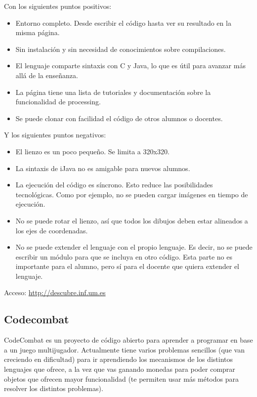 \documentclass{report}
\begin{document}
	Con los siguientes puntos positivos:
	
	\begin{itemize}
		\item Entorno completo. Desde escribir el código hasta ver su resultado en la misma página.
		\item Sin instalación y sin necesidad de conocimientos sobre compilaciones.
		\item El lenguaje comparte sintaxis con C y Java, lo que es útil para avanzar más allá de la enseñanza. 
		\item La página tiene una lista de tutoriales y documentación sobre la funcionalidad de processing.
		\item Se puede clonar con facilidad el código de otros alumnos o docentes.
	\end{itemize}
	
	Y los siguientes puntos negativos:
	
	\begin{itemize}
		\item El lienzo es un poco pequeño. Se limita a 320x320.
		\item La sintaxis de iJava no es amigable para nuevos alumnos.
		\item La ejecución del código es síncrono. Esto reduce las posibilidades tecnológicas. Como por ejemplo, no se pueden cargar imágenes en tiempo de ejecución.
		\item No se puede rotar el lienzo, así que todos los dibujos deben estar alineados a los ejes de coordenadas.
		\item No se puede extender el lenguaje con el propio lenguaje. Es decir, no se puede escribir un módulo para que se incluya en otro código. Esta parte no es importante para el alumno, pero sí para el docente que quiera extender el lenguaje.
	\end{itemize}
	
	\hfill
	
	Acceso: \url{http://descubre.inf.um.es}
	
	\subsection{Codecombat}
	
	CodeCombat es un proyecto de código abierto para aprender a programar en base a un juego multijugador. Actualmente tiene varios problemas sencillos (que van creciendo en dificultad) para ir aprendiendo los mecanismos de los distintos lenguajes que ofrece, a la vez que vas ganando monedas para poder comprar objetos que ofrecen mayor funcionalidad (te permiten usar más métodos para resolver los distintos problemas).
	
\end{document}
